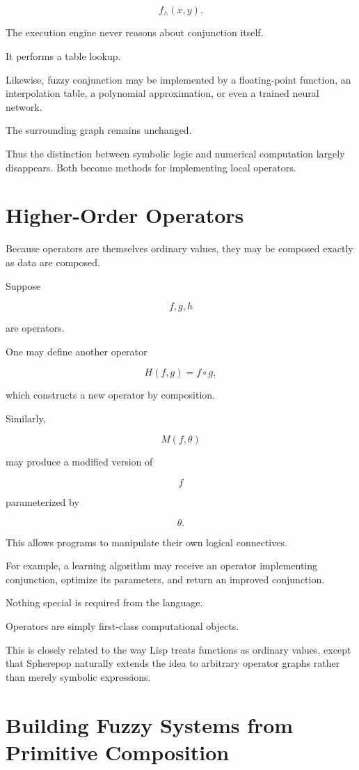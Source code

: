 \documentclass[12pt,oneside]{article}
\begin{document}
\[
f_{\land}(x,y).
\]

The execution engine never reasons about conjunction itself.

It performs a table lookup.

Likewise, fuzzy conjunction may be implemented by a floating-point function, an interpolation table, a polynomial approximation, or even a trained neural network.

The surrounding graph remains unchanged.

Thus the distinction between symbolic logic and numerical computation largely disappears. Both become methods for implementing local operators.

\section{Higher-Order Operators}

Because operators are themselves ordinary values, they may be composed exactly as data are composed.

Suppose

\[
f,g,h
\]

are operators.

One may define another operator

\[
H(f,g)=f\circ g,
\]

which constructs a new operator by composition.

Similarly,

\[
M(f,\theta)
\]

may produce a modified version of

\[
f
\]

parameterized by

\[
\theta.
\]

This allows programs to manipulate their own logical connectives.

For example, a learning algorithm may receive an operator implementing conjunction, optimize its parameters, and return an improved conjunction.

Nothing special is required from the language.

Operators are simply first-class computational objects.

This is closely related to the way Lisp treats functions as ordinary values, except that Spherepop naturally extends the idea to arbitrary operator graphs rather than merely symbolic expressions.

\section{Building Fuzzy Systems from Primitive Composition}
\end{document}
